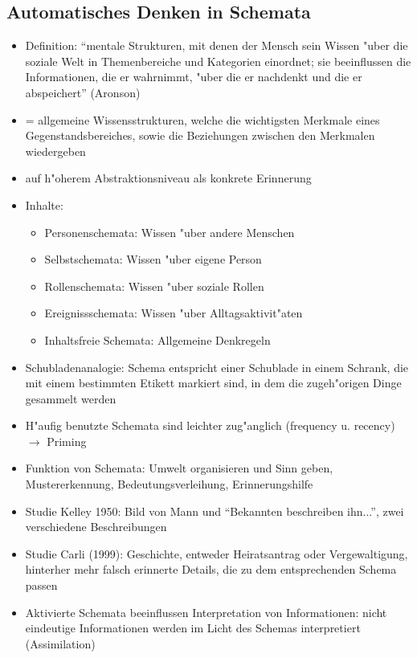 \subsection{Automatisches Denken in Schemata}
\begin{itemize}
	\item
		Definition: \enquote{mentale Strukturen, mit denen der Mensch sein Wissen "uber die soziale Welt in Themenbereiche und Kategorien einordnet; sie beeinflussen die Informationen, die er wahrnimmt, "uber die er nachdenkt und die er abspeichert} (Aronson)
	\item
		= allgemeine Wissensstrukturen, welche die wichtigsten Merkmale eines Gegenstandsbereiches, sowie die Beziehungen zwischen den Merkmalen wiedergeben
	\item
		auf h"oherem Abstraktionsniveau als konkrete Erinnerung
	\item
		Inhalte:
		\begin{itemize}
			\item
				Personenschemata: Wissen "uber andere Menschen
			\item
				Selbstschemata: Wissen "uber eigene Person
			\item
				Rollenschemata: Wissen "uber soziale Rollen
			\item
				Ereignissschemata: Wissen "uber Alltagsaktivit"aten
			\item
				Inhaltsfreie Schemata: Allgemeine Denkregeln
		\end{itemize}
	\item
		Schubladenanalogie: Schema entspricht einer Schublade in einem Schrank, die mit einem bestimmten Etikett markiert sind, in dem die zugeh"origen Dinge gesammelt werden
	\item
		H"aufig benutzte Schemata sind leichter zug"anglich (frequency u. recency)  $\rightarrow$ Priming
	\item
		Funktion von Schemata: Umwelt organisieren und Sinn geben, Mustererkennung, Bedeutungsverleihung, Erinnerungshilfe
	\item
		Studie Kelley 1950: Bild von Mann und \enquote{Bekannten beschreiben ihn...}, zwei verschiedene Beschreibungen
	\item
		Studie Carli (1999): Geschichte, entweder Heiratsantrag oder Vergewaltigung, hinterher mehr falsch erinnerte Details, die zu dem entsprechenden Schema passen
	\item
		Aktivierte Schemata beeinflussen Interpretation von Informationen: nicht eindeutige Informationen werden im Licht des Schemas interpretiert (Assimilation)

\end{itemize}
